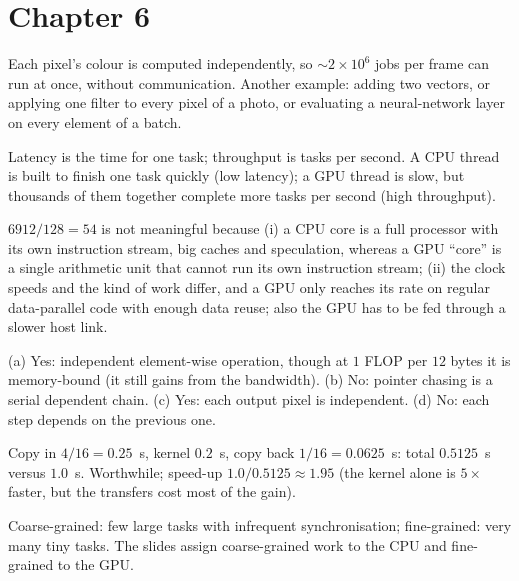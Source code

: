 \section*{Chapter 6}
\begin{description}[leftmargin=1.2cm,labelwidth=1cm,itemsep=3pt]
  \item[6.1] Each pixel's colour is computed independently, so $\sim2\times10^{6}$ jobs per frame can run at once, without communication. Another example: adding two vectors, or applying one filter to every pixel of a photo, or evaluating a neural-network layer on every element of a batch.
  \item[6.2] Latency is the time for one task; throughput is tasks per second. A CPU thread is built to finish one task quickly (low latency); a GPU thread is slow, but thousands of them together complete more tasks per second (high throughput).
  \item[6.3] $6912/128=54$ is not meaningful because (i) a CPU core is a full processor with its own instruction stream, big caches and speculation, whereas a GPU ``core'' is a single arithmetic unit that cannot run its own instruction stream; (ii) the clock speeds and the kind of work differ, and a GPU only reaches its rate on regular data-parallel code with enough data reuse; also the GPU has to be fed through a slower host link.
  \item[6.4] (a) Yes: independent element-wise operation, though at $1$ FLOP per $12$ bytes it is memory-bound (it still gains from the bandwidth). (b) No: pointer chasing is a serial dependent chain. (c) Yes: each output pixel is independent. (d) No: each step depends on the previous one.
  \item[6.5] Copy in $4/16=0.25$~s, kernel $0.2$~s, copy back $1/16=0.0625$~s: total $0.5125$~s versus $1.0$~s. Worthwhile; speed-up $1.0/0.5125\approx1.95$ (the kernel alone is $5\times$ faster, but the transfers cost most of the gain).
  \item[6.6] Coarse-grained: few large tasks with infrequent synchronisation; fine-grained: very many tiny tasks. The slides assign coarse-grained work to the CPU and fine-grained to the GPU.
\end{description}


